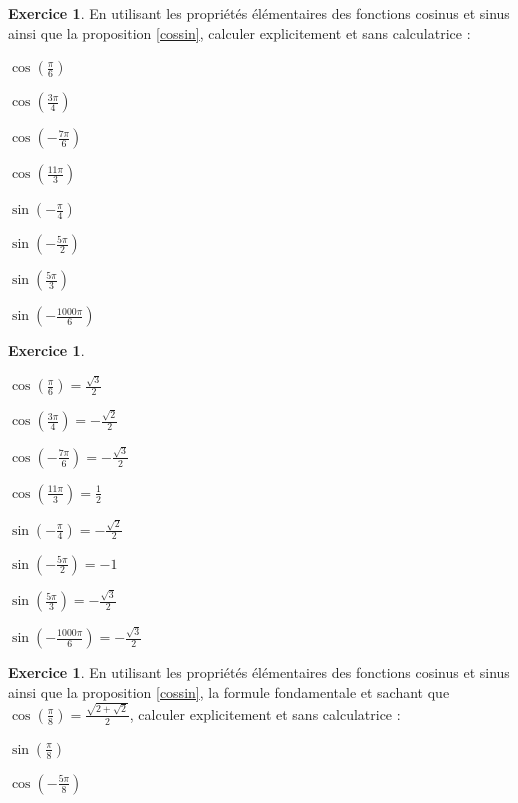 \documentclass[a4paper,fontsize=13pt]{scrreprt}
\theoremstyle{plain}
\theoremstyle{definition}
\newtheorem{exo}[subsection]{Exercice}
\begin{document}
\newpage
\begin{exo}
En utilisant les propriétés élémentaires des fonctions cosinus et sinus ainsi que la proposition \ref{cossin}, calculer explicitement et sans calculatrice :
\begin{enumerate}
\begin{multicols}{2}
\item $\cos(\frac{\pi}{6})$
\item $\cos(\frac{3\pi}{4})$
\item $\cos(-\frac{7\pi}{6})$
\item $\cos(\frac{11\pi}{3})$
\item $\sin(-\frac{\pi}{4})$
\item $\sin(-\frac{5\pi}{2})$
\item $\sin(\frac{5\pi}{3})$
\item $\sin(-\frac{1000\pi}{6})$
\end{multicols}
\end{enumerate}
\end{exo}

\begin{exo}
~\\
\begin{enumerate}
\begin{multicols}{2}
\item $\cos(\frac{\pi}{6})=\frac{\sqrt{3}}{2}$
\item $\cos(\frac{3\pi}{4})=-\frac{\sqrt{2}}{2}$
\item $\cos(-\frac{7\pi}{6})=-\frac{\sqrt{3}}{2}$
\item $\cos(\frac{11\pi}{3})=\frac{1}{2}$
\item $\sin(-\frac{\pi}{4})=-\frac{\sqrt{2}}{2}$
\item $\sin(-\frac{5\pi}{2})=-1$
\item $\sin(\frac{5\pi}{3})=-\frac{\sqrt{3}}{2}$
\item $\sin(-\frac{1000\pi}{6})=-\frac{\sqrt{3}}{2}$
\end{multicols}
\end{enumerate}
\end{exo}

\begin{exo}
En utilisant les propriétés élémentaires des fonctions cosinus et sinus ainsi que la proposition \ref{cossin}, la formule fondamentale et sachant que $\cos(\frac{\pi}{8}) = \frac{\sqrt{2+\sqrt{2}}}{2}$, calculer explicitement et sans calculatrice :
\begin{enumerate}
\begin{multicols}{2}
\item $\sin(\frac{\pi}{8})$
\item $\cos(-\frac{5\pi}{8})$
\end{multicols}
\end{enumerate}
\end{exo}
\end{document}
